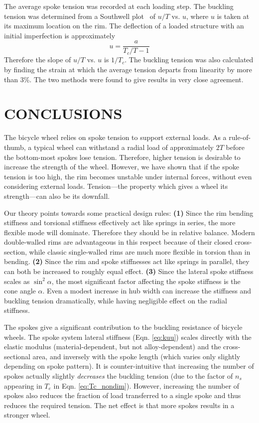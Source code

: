 \documentclass{bmd2016p}
\begin{document}
The average spoke tension was recorded at each loading step. The buckling tension was determined from a Southwell plot~\cite{Timoshenko1961a} of $u/T$ vs. $u$, where $u$ is taken at its maximum location on the rim. The deflection of a loaded structure with an initial imperfection is approximately
	\begin{equation}\label{eq:Southwell}
	u = \frac{a}{T_c/T - 1}
	\end{equation}
Therefore the slope of $u/T$ vs. $u$ is $1/T_c$. The buckling tension was also calculated by finding the strain at which the average tension departs from linearity by more than 3\%. The two methods were found to give results in very close agreement.



\section{CONCLUSIONS}
The bicycle wheel relies on spoke tension to support external loads. As a rule-of-thumb, a typical wheel can withstand a radial load of approximately $2T$ before the bottom-most spokes lose tension. Therefore, higher tension is desirable to increase the strength of the wheel. However, we have shown that if the spoke tension is too high, the rim becomes unstable under internal forces, without even considering external loads. Tension---the property which gives a wheel its strength---can also be its downfall.

Our theory points towards some practical design rules: \textbf{(1)} Since the rim bending stiffness and torsional stiffness effectively act like springs in series, the more flexible mode will dominate. Therefore they should be in relative balance. Modern double-walled rims are advantageous in this respect because of their closed cross-section, while classic single-walled rims are much more flexible in torsion than in bending. \textbf{(2)} Since the rim and spoke stiffnesses act like springs in parallel, they can both be increased to roughly equal effect. \textbf{(3)} Since the lateral spoke stiffness scales as $\sin^2{\alpha}$, the most significant factor affecting the spoke stiffness is the cone angle $\alpha$. Even a modest increase in hub width can increase the stiffness and buckling tension dramatically, while having negligible effect on the radial stiffness.

The spokes give a significant contribution to the buckling resistance of bicycle wheels. The spoke system lateral stiffness (Eqn. \ref{eq:kuu}) scales directly with the elastic modulus (material-dependent, but not alloy-dependent) and the cross-sectional area, and inversely with the spoke length (which varies only slightly depending on spoke pattern). It is counter-intuitive that increasing the number of spokes actually slightly \textit{decreases} the buckling tension (due to the factor of $n_s$ appearing in $T_e$ in Eqn. \ref{eq:Tc_nondim}). However, increasing the number of spokes also reduces the fraction of load transferred to a single spoke and thus reduces the required tension. The net effect is that more spokes results in a stronger wheel.
\end{document}
